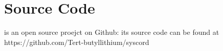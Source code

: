 
\section*{Source Code}
\TheName is an open source proejct on Github: its source code can be found at https://github.com/Tert-butyllithium/syscord